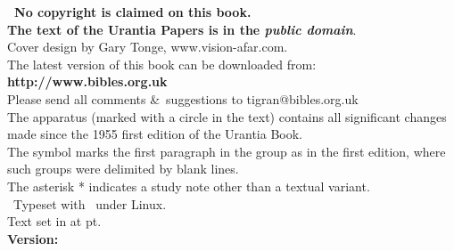
\newpage
\makeatletter
{}%
\makeatother

\begin{center}
\parbox{0.9\linewidth}{\centering
\textbf{\upshape\nocopyright\ No copyright is claimed on this book.\\
The text of the Urantia Papers is in the \itshape public domain}.\\[5pt]
Cover design by Gary Tonge, www.vision-afar.com.\\
The latest version of this book can be downloaded from:\\
{\upshape\bfseries http://www.bibles.org.uk}\\
Please send all comments \&\ suggestions to {\makeatletter\upshape tigran@bibles.org.uk\makeatother}\\
The apparatus (marked with a circle in the text) contains all significant changes made since the 1955 first edition of the Urantia Book.\\
The symbol \pc{} marks the first paragraph in the group as in the first edition, where such groups were delimited by blank lines.\\
The asterisk * indicates a study note other than a textual variant.\\[5pt]
\tux\ Typeset with \XeLaTeX\ under Linux.\\
Text set in \textbf{\urantiamainfont} at \urantiamainfontsize pt.\\[18pt]
\upshape\small\bfseries Version: \mytoday{}\\
}
\end{center}

